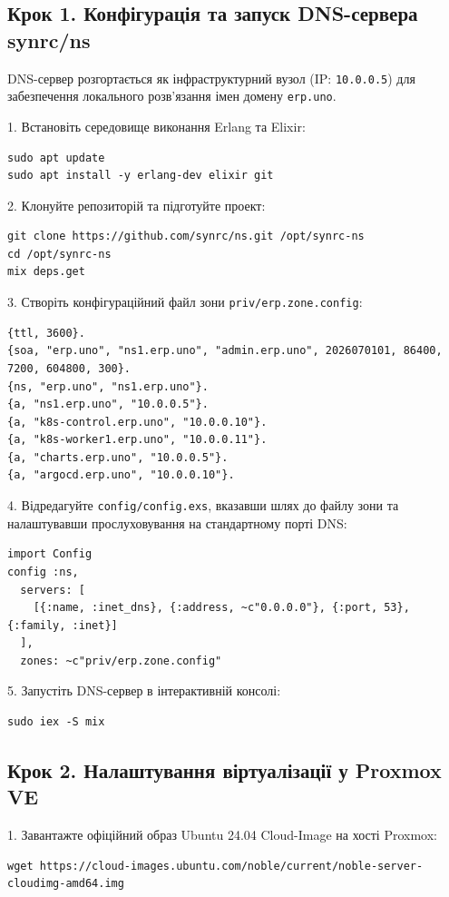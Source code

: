 \documentclass{article}
\begin{document}
\subsection{Крок 1. Конфігурація та запуск DNS-сервера synrc/ns}
DNS-сервер розгортається як інфраструктурний вузол (IP: \texttt{10.0.0.5}) для забезпечення локального розв'язання імен домену \texttt{erp.uno}.

1. Встановіть середовище виконання Erlang та Elixir:
\begin{lstlisting}
sudo apt update
sudo apt install -y erlang-dev elixir git
\end{lstlisting}

2. Клонуйте репозиторій та підготуйте проект:
\begin{lstlisting}
git clone https://github.com/synrc/ns.git /opt/synrc-ns
cd /opt/synrc-ns
mix deps.get
\end{lstlisting}

3. Створіть конфігураційний файл зони \texttt{priv/erp.zone.config}:
\begin{lstlisting}
{ttl, 3600}.
{soa, "erp.uno", "ns1.erp.uno", "admin.erp.uno", 2026070101, 86400, 7200, 604800, 300}.
{ns, "erp.uno", "ns1.erp.uno"}.
{a, "ns1.erp.uno", "10.0.0.5"}.
{a, "k8s-control.erp.uno", "10.0.0.10"}.
{a, "k8s-worker1.erp.uno", "10.0.0.11"}.
{a, "charts.erp.uno", "10.0.0.5"}.
{a, "argocd.erp.uno", "10.0.0.10"}.
\end{lstlisting}

4. Відредагуйте \texttt{config/config.exs}, вказавши шлях до файлу зони та налаштувавши прослуховування на стандартному порті DNS:
\begin{lstlisting}
import Config
config :ns,
  servers: [
    [{:name, :inet_dns}, {:address, ~c"0.0.0.0"}, {:port, 53}, {:family, :inet}]
  ],
  zones: ~c"priv/erp.zone.config"
\end{lstlisting}

5. Запустіть DNS-сервер в інтерактивній консолі:
\begin{lstlisting}
sudo iex -S mix
\end{lstlisting}

\subsection{Крок 2. Налаштування віртуалізації у Proxmox VE}
1. Завантажте офіційний образ Ubuntu 24.04 Cloud-Image на хості Proxmox:
\begin{lstlisting}
wget https://cloud-images.ubuntu.com/noble/current/noble-server-cloudimg-amd64.img
\end{lstlisting}
\end{document}
